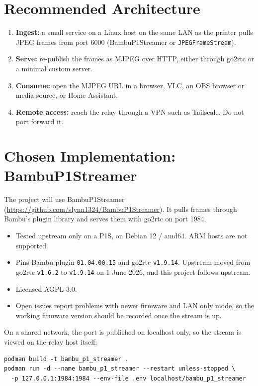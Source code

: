 \documentclass[11pt]{article}
\begin{document}
\section{Recommended Architecture}
\begin{enumerate}[itemsep=2pt]
  \item \textbf{Ingest:} a small service on a Linux host on the same LAN as the printer pulls
        JPEG frames from port 6000 (BambuP1Streamer or \texttt{JPEGFrameStream}).
  \item \textbf{Serve:} re-publish the frames as MJPEG over HTTP, either through go2rtc or a
        minimal custom server.
  \item \textbf{Consume:} open the MJPEG URL in a browser, VLC, an OBS browser or media source,
        or Home Assistant.
  \item \textbf{Remote access:} reach the relay through a VPN such as Tailscale. Do not
        port forward it.
\end{enumerate}

\section{Chosen Implementation: BambuP1Streamer}
The project will use BambuP1Streamer
(\url{https://github.com/slynn1324/BambuP1Streamer}). It pulls frames through Bambu's
plugin library and serves them with go2rtc on port 1984.

\begin{itemize}[itemsep=2pt]
  \item Tested upstream only on a P1S, on Debian 12 / amd64. ARM hosts are not supported.
  \item Pins Bambu plugin \texttt{01.04.00.15} and go2rtc \texttt{v1.9.14}. Upstream moved
        from go2rtc \texttt{v1.6.2} to \texttt{v1.9.14} on 1 June 2026, and this project
        follows upstream.
  \item Licensed AGPL-3.0.
  \item Open issues report problems with newer firmware and LAN only mode, so the working
        firmware version should be recorded once the stream is up.
\end{itemize}

On a shared network, the port is published on localhost only, so the stream is viewed on
the relay host itself:

\begin{lstlisting}[language={}]
podman build -t bambu_p1_streamer .
podman run -d --name bambu_p1_streamer --restart unless-stopped \
  -p 127.0.0.1:1984:1984 --env-file .env localhost/bambu_p1_streamer
\end{lstlisting}
\end{document}
